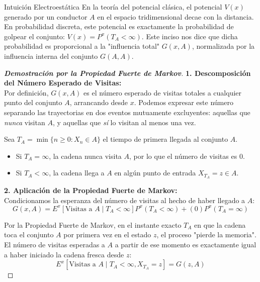 \documentclass[10pt,a4paper]{article}
\begin{document}
\vspace{2mm}

\begin{nota}{Intuición Electroestática}
    En la teoría del potencial clásica, el potencial $V(x)$ generado por un conductor $A$ en el espacio tridimensional decae con la distancia. En probabilidad discreta, este potencial es exactamente la probabilidad de golpear el conjunto: $V(x) = P^x(T_A < \infty)$. 
    Este inciso nos dice que dicha probabilidad es proporcional a la "influencia total" $G(x,A)$, normalizada por la influencia interna del conjunto $G(A,A)$.
\end{nota}

\vspace{5mm}

\begin{proof}[\textbf{Demostración por la Propiedad Fuerte de Markov}]
    \textbf{1. Descomposición del Número Esperado de Visitas:} \\
    Por definición, $G(x, A)$ es el número esperado de visitas totales a cualquier punto del conjunto $A$, arrancando desde $x$. 
    Podemos expresar este número separando las trayectorias en dos eventos mutuamente excluyentes: aquellas que \textit{nunca} visitan $A$, y aquellas que \textit{sí} lo visitan al menos una vez.
    
    Sea $T_A = \min \{n \ge 0 : X_n \in A\}$ el tiempo de primera llegada al conjunto $A$. 
    \begin{itemize}
        \item Si $T_A = \infty$, la cadena nunca visita $A$, por lo que el número de visitas es $0$.
        \item Si $T_A < \infty$, la cadena llega a $A$ en algún punto de entrada $X_{T_A} = z \in A$.
    \end{itemize}

    \textbf{2. Aplicación de la Propiedad Fuerte de Markov:} \\
    Condicionamos la esperanza del número de visitas al hecho de haber llegado a $A$:
    \[ G(x, A) = E^x \left[ \text{Visitas a } A \mid T_A < \infty \right] P^x(T_A < \infty) + (0) P^x(T_A = \infty) \]
    
    Por la Propiedad Fuerte de Markov, en el instante exacto $T_A$ en que la cadena toca el conjunto $A$ por primera vez en el estado $z$, el proceso "pierde la memoria". El número de visitas esperadas a $A$ a partir de ese momento es exactamente igual a haber iniciado la cadena fresca desde $z$:
    \[ E^x \left[ \text{Visitas a } A \mid T_A < \infty, X_{T_A} = z \right] = G(z, A) \]
    

\end{proof}
\end{document}
